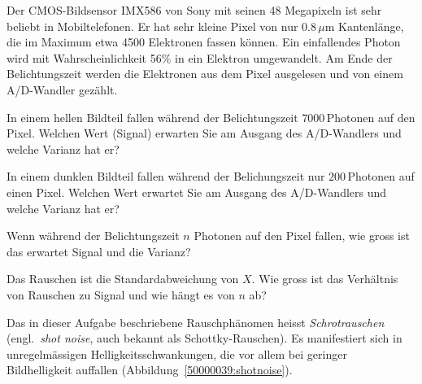 %
%
%
%
%
Der CMOS-Bildsensor IMX586 von Sony mit seinen 48 Megapixeln ist sehr beliebt
in Mobiltelefonen. 
Er hat sehr kleine Pixel von nur $0.8\,\mu\text{m}$ Kantenlänge, die im
Maximum etwa 4500 Elektronen fassen können.
Ein einfallendes Photon wird mit Wahrscheinlichkeit 56\% in ein Elektron
umgewandelt.
Am Ende der Belichtungszeit werden die Elektronen aus dem Pixel ausgelesen
und von einem A/D-Wandler gezählt.
\begin{teilaufgaben}
\item
In einem hellen Bildteil fallen während der Belichtungszeit $7000$\,Photonen
auf den Pixel.
Welchen Wert (Signal) erwarten Sie am Ausgang des A/D-Wandlers und welche
Varianz hat er?
\item
In einem dunklen Bildteil fallen während der Belichungszeit nur $200$\,Photonen
auf einen Pixel.
Welchen Wert erwartet Sie am Ausgang des A/D-Wandlers und welche Varianz
hat er?
\item
Wenn während der Belichtungszeit $n$ Photonen auf den Pixel fallen,
wie gross ist das erwartet Signal und die Varianz?
\item
Das Rauschen ist die Standardabweichung von $X$.
Wie gross ist das Verhältnis von Rauschen zu Signal und wie hängt
es von $n$ ab?
\end{teilaufgaben}
Das in dieser Aufgabe beschriebene Rauschphänomen heisst {\em Schrotrauschen}
(engl.~{\em shot noise}, auch bekannt als Schottky-Rauschen).
Es manifestiert sich in unregelmässigen Helligkeitsschwankungen, die
vor allem bei geringer Bildhelligkeit auffallen
(Abbildung~\ref{50000039:shotnoise}).

